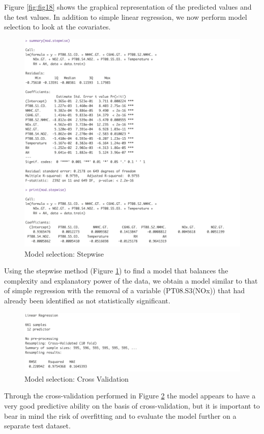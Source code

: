 \documentclass{article}
\begin{document}
Figure \ref{fig:fig18} shows the graphical representation of the predicted values and the test values. 
In addition to simple linear regression, we now perform model selection to look at the covariates.
\begin{figure}[H]
   \centering
   \includegraphics[width=\linewidth]{images/stepwise.png}
   \caption{Model selection: Stepwise}
   \label{fig:fig19}
\end{figure}
Using the stepwise method (Figure \ref{fig:fig19}) to find a model that balances the complexity and explanatory power of the data, we obtain a model similar to that of simple regression with the removal of a variable (PT08.S3(NOx)) that had already been identified as not statistically significant.
\begin{figure}[H]
   \centering
   \includegraphics[width=\linewidth]{images/cv.png}
   \caption{Model selection: Cross Validation}
   \label{fig:fig20}
\end{figure}
Through the cross-validation performed in Figure \ref{fig:fig20} the model appears to have a very good predictive ability on the basis of cross-validation, but it is important to bear in mind the risk of overfitting and to evaluate the model further on a separate test dataset.
\end{document}
